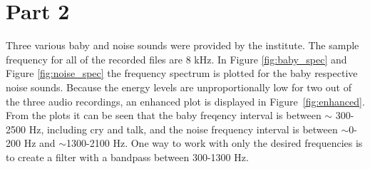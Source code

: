 \newpage
\section{Part 2}
Three various baby and noise sounds were provided by the institute. The sample frequency for all of the recorded 
files are 8 kHz. In Figure \ref{fig:baby_spec} and Figure \ref{fig:noise_spec} the frequency 
spectrum is plotted for the baby respective noise sounds. Because the energy levels are unproportionally 
low for two out of the three audio recordings, an enhanced plot is displayed in Figure~\ref{fig:enhanced}. 
From the plots it can be seen that the baby freqency interval is between $\sim$ 300-2500 Hz, including cry and talk, 
and the noise frequency interval is between $\sim$0-200 Hz and $\sim$1300-2100 Hz. One way to work with only
the desired frequencies is to create a filter with a bandpass between 300-1300 Hz. 

%

